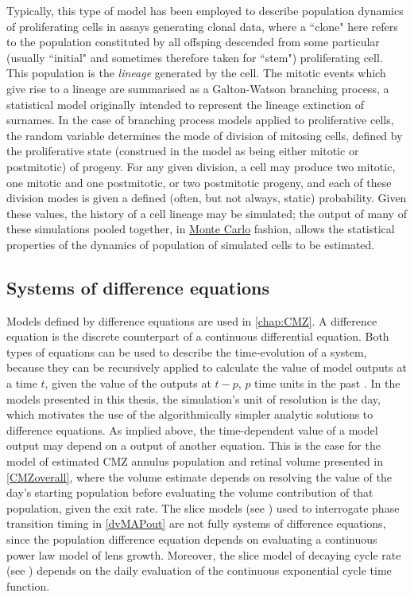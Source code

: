 Typically, this type of model has been employed to describe population dynamics of proliferating cells in assays generating clonal data, where a ``clone" here refers to the population constituted by all offsping descended from some particular (usually ``initial" and sometimes therefore taken for ``stem") proliferating cell. This population is the \textit{lineage} generated by the cell. The mitotic events which give rise to a lineage are summarised as a Galton-Watson branching process, a statistical model originally intended to represent the lineage extinction of surnames. In the case of branching process models applied to proliferative cells, the random variable determines the mode of division of mitosing cells, defined by the proliferative state (construed in the model as being either mitotic or postmitotic) of progeny. For any given division, a cell may produce two mitotic, one mitotic and one postmitotic, or two postmitotic progeny, and each of these division modes is given a defined (often, but not always, static) probability. Given these values, the history of a cell lineage may be simulated; the output of many of these simulations pooled together, in \hyperref[ssec:MonteCarlo]{Monte Carlo} fashion, allows the statistical properties of the dynamics of population of simulated cells to be estimated.

\subsection{Systems of difference equations}
\label{ssec:SODE}
Models defined by difference equations are used in \autoref{chap:CMZ}. A difference equation is the discrete counterpart of a continuous differential equation. Both types of equations can be used to describe the time-evolution of a system, because they can be recursively applied to calculate the value of model outputs at a time $t$, given the value of the outputs at $t-p$, $p$ time units in the past \cite[p.1]{Kelley2001}. In the models presented in this thesis, the simulation's unit of resolution is the day, which motivates the use of the algorithmically simpler analytic solutions to difference equations. As implied above, the time-dependent value of a model output may depend on a output of another equation. This is the case for the model of estimated CMZ annulus population and retinal volume presented in \autoref{CMZoverall}, where the volume estimate depends on resolving the value of the day's starting population before evaluating the volume contribution of that population, given the exit rate. The slice models (see \hyperref[sec:slicemodel]{}) used to interrogate phase transition timing in \autoref{dvMAPout} are not fully systems of difference equations, since the population difference equation depends on evaluating a continuous power law model of lens growth. Moreover, the slice model of decaying cycle rate (see \hyperref[sec:decaymodel]{}) depends on the daily evaluation of the continuous exponential cycle time function.

